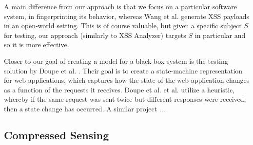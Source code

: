 A main difference from our approach is that we focus on a particular software system, in fingerprinting its behavior, whereas Wang et al. generate XSS payloads in an open-world setting. This is of course valuable, but given a specific subject $S$ for testing, our approach (similarly to XSS Analyzer) targets $S$ in particular and so it is more effective.

Closer to our goal of creating a model for a black-box system is the testing solution by Doupe  et al. \cite{FromXssAnalyzer}. Their goal is to create a state-machine representation for web applications, which captures
how the state of the web application changes as a function of the requests it receives. Doupe  et al. et al. utilize a heuristic, whereby if the same request was sent twice but different responses were received, then a state change has occurred. A similar project ...



\subsection{Compressed Sensing}